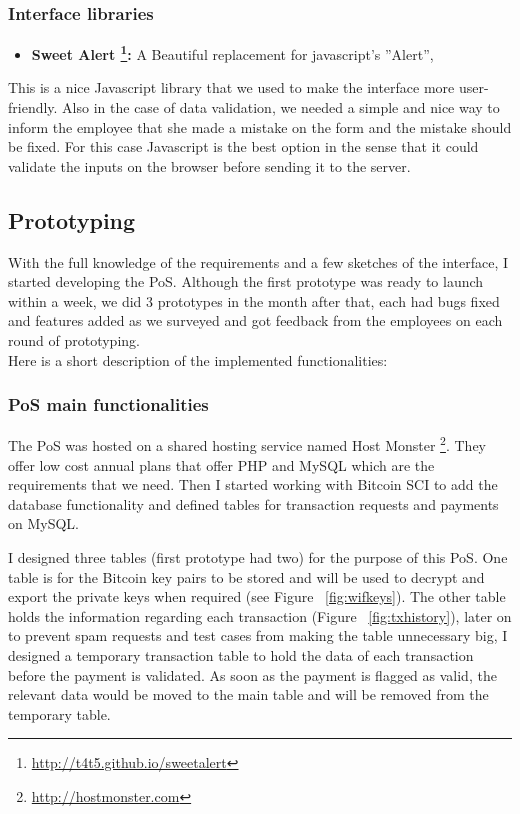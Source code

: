 \subsubsection{Interface libraries}
\begin{itemize}
\item \textbf{Sweet Alert \footnote{\url{http://t4t5.github.io/sweetalert}}: }  A Beautiful replacement for javascript's ''Alert'', 
\end{itemize}

This is a nice Javascript library that we used to make the interface more user-friendly. Also in the case of data validation, we needed a simple and nice way to inform the employee that she made a mistake on the form and the mistake should be fixed. For this case Javascript is the best option in the sense that it could validate the inputs on the browser before sending it to the server.


\subsection{Prototyping}
With the full knowledge of the requirements and a few sketches of the interface, I started developing the PoS. Although the first prototype was ready to launch within a week, we did 3 prototypes in the month after that, each had bugs fixed and features added as we surveyed and got feedback from the employees on each round of prototyping.
\\
Here is a short description of the implemented functionalities:

\subsubsection{PoS main functionalities}
The PoS was hosted on a shared hosting service named Host Monster \footnote{\url{http://hostmonster.com}}. They offer low cost annual plans that offer PHP and MySQL which are the requirements that we need.
Then I started working with Bitcoin SCI to add the database functionality and defined tables for transaction requests and payments on MySQL.

I designed three tables (first prototype had two) for the purpose of this PoS. One table is for the Bitcoin key pairs to be stored and will be used to decrypt and export the private keys when required (see Figure ~\ref{fig:wifkeys}). The other table holds the information regarding each transaction (Figure ~\ref{fig:txhistory}), later on to prevent spam requests and test cases from making the table unnecessary big, I designed a temporary transaction table to hold the data of each transaction before the payment is validated. As soon as the payment is flagged as valid, the relevant data would be moved to the main table and will be removed from the temporary table.

